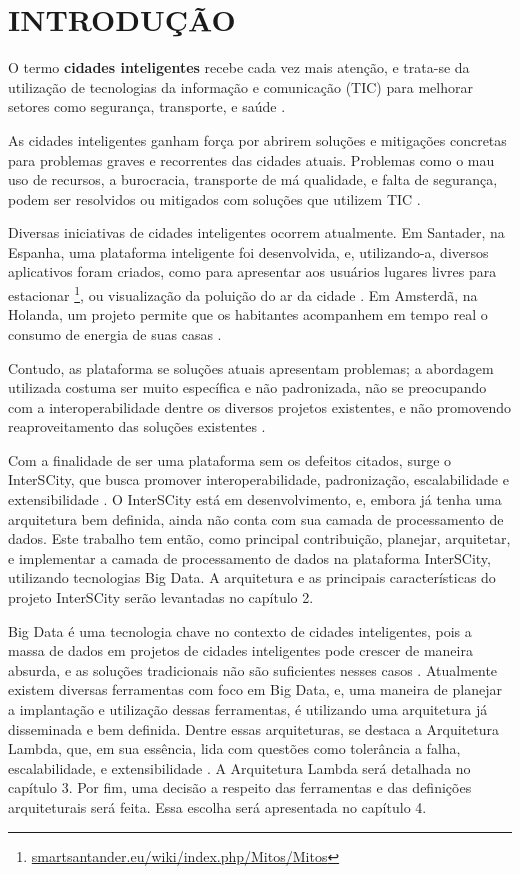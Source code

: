 \chapter[INTRODUÇÃO]{INTRODUÇÃO}

O termo \textbf{cidades inteligentes} recebe cada vez mais atenção, e trata-se
da utilização de tecnologias da informação e comunicação (TIC) para melhorar
setores como segurança, transporte, e saúde \cite{batty2012smart}.

As cidades inteligentes ganham força por abrirem soluções e mitigações
concretas para problemas graves e recorrentes das cidades atuais. Problemas
como o mau uso de recursos, a burocracia, transporte de má qualidade,
e falta de segurança, podem ser resolvidos ou mitigados com soluções que
utilizem TIC \cite{batty2012smart}.

Diversas iniciativas de cidades inteligentes ocorrem atualmente. Em Santader,
na Espanha, uma plataforma inteligente foi desenvolvida, e, utilizando-a,
diversos aplicativos foram criados, como para apresentar aos usuários lugares
livres para estacionar
\footnote{\url{smartsantander.eu/wiki/index.php/Mitos/Mitos}}, ou visualização
da poluição do ar da cidade \cite{santana2016software}. Em Amsterdã, na Holanda,
um projeto permite que os habitantes acompanhem em tempo real o consumo de
energia de suas casas \cite{kon2016}.

Contudo, as plataforma se soluções atuais apresentam problemas; a abordagem
utilizada costuma ser muito específica e não padronizada, não se preocupando
com a interoperabilidade dentre os diversos projetos existentes, e não
promovendo reaproveitamento das soluções existentes \cite{delesposte2017}.

Com a finalidade de ser uma plataforma sem os defeitos citados, surge o
InterSCity, que busca promover interoperabilidade, padronização,
escalabilidade e extensibilidade \cite{delesposte2017}. O InterSCity está em
desenvolvimento, e, embora já tenha uma arquitetura bem definida, ainda não
conta com sua camada de processamento de dados. Este trabalho tem então, como
principal contribuição, planejar, arquitetar, e implementar a camada de
processamento de dados na plataforma InterSCity, utilizando tecnologias Big
Data. A arquitetura e as principais características do projeto InterSCity serão
levantadas no capítulo 2.

Big Data é uma tecnologia chave no contexto de cidades inteligentes, pois a
massa de dados em projetos de cidades inteligentes pode crescer de maneira
absurda, e as soluções tradicionais não são suficientes nesses
casos \cite{batty2012smart}. Atualmente existem diversas ferramentas com foco
em Big Data, e, uma maneira de planejar a implantação e utilização dessas
ferramentas, é utilizando uma arquitetura já disseminada e bem definida.
Dentre essas arquiteturas, se destaca a Arquitetura Lambda, que, em sua
essência, lida com questões como tolerância a falha, escalabilidade, e
extensibilidade \cite{marz2015}. A Arquitetura Lambda será detalhada no
capítulo 3. Por fim, uma decisão a respeito das ferramentas e das definições
arquiteturais será feita. Essa escolha será apresentada no capítulo 4.

